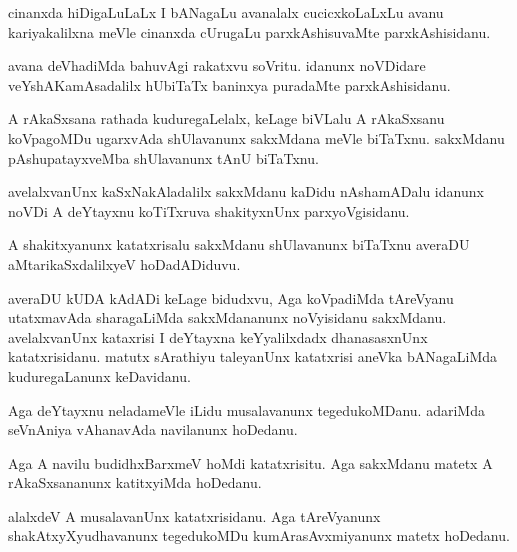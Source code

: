\documentclass{article}
\begin{document}
\begin{mng}%
cinanxda hiDigaLuLaLx I bANagaLu avanalalx cucicxkoLaLxLu avanu kariyakalilxna meVle cinanxda 
cUrugaLu parxkAshisuvaMte parxkAshisidanu.
\end{mng}

\begin{mng}%
avana deVhadiMda bahuvAgi rakatxvu soVritu. idanunx noVDidare veYshAKamAsadalilx hUbiTaTx baninxya 
puradaMte parxkAshisidanu.
\end{mng}

\begin{mng}%
A rAkaSxsana rathada kuduregaLelalx, keLage biVLalu A rAkaSxsanu koVpagoMDu ugarxvAda shUlavanunx 
sakxMdana meVle biTaTxnu. sakxMdanu pAshupatayxveMba shUlavanunx tAnU biTaTxnu.
\end{mng}

\begin{mng}%
avelalxvanUnx kaSxNakAladalilx sakxMdanu kaDidu nAshamADalu idanunx noVDi A deYtayxnu koTiTxruva 
shakityxnUnx parxyoVgisidanu.
\end{mng}

\begin{mng}%
A shakitxyanunx katatxrisalu sakxMdanu shUlavanunx biTaTxnu averaDU aMtarikaSxdalilxyeV hoDadADiduvu.
\end{mng}

\begin{mng}%
averaDU  kUDA kAdADi keLage bidudxvu, Aga koVpadiMda tAreVyanu utatxmavAda sharagaLiMda 
sakxMdananunx noVyisidanu sakxMdanu. avelalxvanUnx kataxrisi I deYtayxna keYyalilxdadx 
dhanasasxnUnx katatxrisidanu. matutx  sArathiyu taleyanUnx katatxrisi aneVka bANagaLiMda 
kuduregaLanunx keDavidanu.
\end{mng}

\begin{mng}%
Aga deYtayxnu neladameVle iLidu musalavanunx tegedukoMDanu. adariMda seVnAniya vAhanavAda 
navilanunx hoDedanu.
\end{mng}

\begin{mng}%
Aga A navilu budidhxBarxmeV hoMdi katatxrisitu. Aga sakxMdanu matetx A rAkaSxsananunx katitxyiMda 
hoDedanu.
\end{mng}

\begin{mng}%
alalxdeV A musalavanUnx katatxrisidanu. Aga tAreVyanunx shakAtxyXyudhavanunx tegedukoMDu 
kumArasAvxmiyanunx matetx hoDedanu.
\end{mng}
\end{document}

